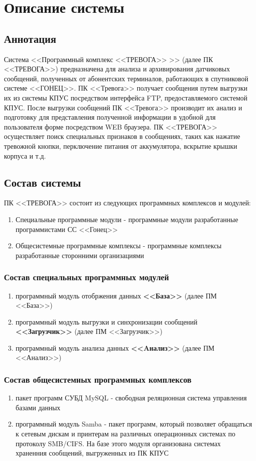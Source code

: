 ﻿\documentclass[12pt]{article}[a4paper,14pt,russian]
\begin{document}
	\section{Описание системы}
	\subsection{Аннотация}

	Система <<Программный комплекс <<ТРЕВОГА>> >> (далее ПК <<ТРЕВОГА>>) предназначена для анализа и архивирования датчиковых сообщений, полученных от абонентских терминалов, работающих в спутниковой системе <<ГОНЕЦ>>. ПК <<Тревога>> получает сообщения путем выгрузки их из системы КПУС посредством интерфейса FTP, предоставляемого системой КПУС. После выгрузки сообщений ПК <<Тревога>> производит их анализ и подготовку для представления полученной информации в удобной для пользователя форме посредством WEB браузера. ПК <<ТРЕВОГА>> осуществляет поиск специальных признаков в сообщениях, таких как нажатие тревожной кнопки, перключение питания от аккумулятора, вскрытие крышки корпуса и т.д.
	
	\subsection{Состав системы}
    ПК <<ТРЕВОГА>> состоит из следующих программных комплексов и модулей:
	\begin{enumerate}
	\item  Специальные программные модули - программные модули разработанные программистами  СС <<Гонец>>
	\item  Общесистемные программные комплексы  - программные комплексы разработанные сторонними организациями
	\end{enumerate}
    \subsubsection {Состав специальных программных модулей}
	\begin{enumerate}
	\item программный модуль отобржения данных \textbf{<<База>>} (далее ПМ <<База>>)
	\item программный модуль выгрузки и синхронизации сообщений \textbf{<<Загрузчик>>} (далее ПМ <<Загрузчик>>)
	\item программный модуль анализа данных \textbf{<<Aнализ>>} (далее ПМ <<Анализ>>)
	\end{enumerate}
    \subsubsection {Состав общесистемных программных комплексов}
    \begin{enumerate}
    \item пакет программ СУБД MySQL - свободная реляционная система управления базами данных
    \item программный модуль Samba - пакет программ, который позволяет обращаться к сетевым дискам и принтерам на различных операционных системах по протоколу SMB/CIFS. На базе этого модуля организована системах храненния сообщений, выгруженных из ПК КПУС
    \end{enumerate}
\end{document}
